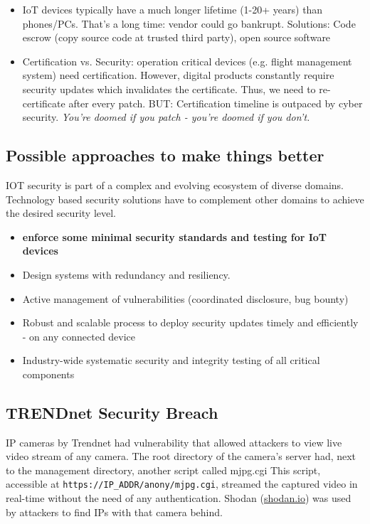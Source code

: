 \begin{itemize}
	\item IoT devices typically have a much longer lifetime (1-20+ years) than phones/PCs. That's a long time: vendor could go bankrupt. Solutions: Code escrow (copy source code at trusted third party), open source software
	\item Certification vs. Security: operation critical devices (e.g. flight management system) need certification. However, digital products constantly require security updates which invalidates the certificate. Thus, we need to re-certificate after every patch. BUT: Certification timeline is outpaced by cyber security.
	\subitem \textit{You're doomed if you patch - you're doomed if you don't.}
\end{itemize}

\subsection{Possible approaches to make things better}

IOT security is part of a complex and evolving ecosystem of diverse domains. Technology based security solutions have to complement other domains to achieve the desired security level.

\begin{itemize}
	\item \textbf{enforce some minimal security standards and testing for IoT devices}
	\item Design systems with redundancy and resiliency.
	\item Active management of vulnerabilities (coordinated disclosure, bug bounty)
	\item Robust and scalable process to deploy security updates timely and efficiently - on any connected device
	\item Industry-wide systematic security and integrity testing of all critical components
\end{itemize}


\subsection{TRENDnet Security Breach}

IP cameras by Trendnet had vulnerability that allowed attackers to view live video stream of any camera. The root directory of the camera’s server had, next to the management directory, another script called mjpg.cgi This script, accessible at \texttt{https://IP\_ADDR/anony/mjpg.cgi}, streamed the captured video in real-time without the need of any authentication. Shodan (\href{https://www.shodan.io/}{shodan.io}) was used by attackers to find IPs with that camera behind.
